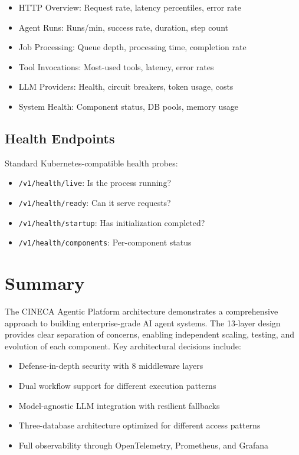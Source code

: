 \documentclass[a4paper,twoside]{sapthesis}
\begin{document}
\begin{itemize}
    \item HTTP Overview: Request rate, latency percentiles, error rate
    \item Agent Runs: Runs/min, success rate, duration, step count
    \item Job Processing: Queue depth, processing time, completion rate
    \item Tool Invocations: Most-used tools, latency, error rates
    \item LLM Providers: Health, circuit breakers, token usage, costs
    \item System Health: Component status, DB pools, memory usage
\end{itemize}

\subsection{Health Endpoints}
\label{subsec:health-endpoints}

Standard Kubernetes-compatible health probes:

\begin{itemize}
    \item \texttt{/v1/health/live}: Is the process running?
    \item \texttt{/v1/health/ready}: Can it serve requests?
    \item \texttt{/v1/health/startup}: Has initialization completed?
    \item \texttt{/v1/health/components}: Per-component status
\end{itemize}

\section{Summary}
\label{sec:arch-summary}

The CINECA Agentic Platform architecture demonstrates a comprehensive approach to building enterprise-grade AI agent systems. The 13-layer design provides clear separation of concerns, enabling independent scaling, testing, and evolution of each component. Key architectural decisions include:

\begin{itemize}
    \item Defense-in-depth security with 8 middleware layers
    \item Dual workflow support for different execution patterns
    \item Model-agnostic LLM integration with resilient fallbacks
    \item Three-database architecture optimized for different access patterns
    \item Full observability through OpenTelemetry, Prometheus, and Grafana
\end{itemize}
\end{document}
